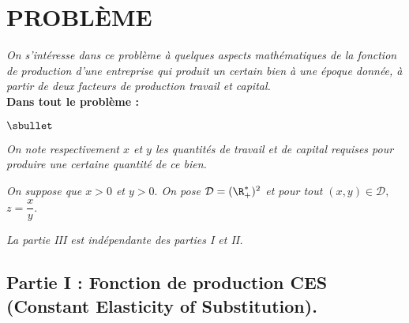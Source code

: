 

\section*{PROBLÈME} %
\noindent 
{\it On s'intéresse dans ce problème à quelques aspects 
mathématiques de la fonction de production d'une entreprise
qui produit un certain bien à une époque donnée, à partir de deux 
facteurs de production travail et capital.}\\
\textbf{Dans tout le problème :}
\begin{noliste}{$\sbullet$}
 \item {\it On note respectivement $x$ et $y$ les quantités de 
 travail et de capital requises pour produire une certaine quantité de 
 ce bien.}
 \item {\it On suppose que $x>0$ et $y>0.$ On pose 
 $\mathcal{D}=(\R_+^*)^2$ et pour tout $(x,y)\in \mathcal{D},$ 
 $z=\dfrac{x}{y}.$}
\end{noliste}
{\it La partie III est indépendante des parties I et II.}


\subsection*{Partie I : Fonction de production CES (Constant Elasticity 
of Substitution).}

